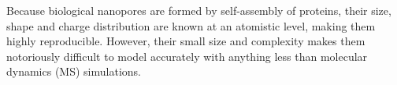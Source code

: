\documentclass[journal=ancac3,manuscript=article,etalmode=truncate,maxauthors=0,layout=twocolumn]{achemso}
\begin{document}
Because biological nanopores are formed by self-assembly of proteins, their size, shape and charge
distribution are known at an atomistic level, making them highly reproducible. However, their small size and
complexity makes them notoriously difficult to model accurately with anything less than molecular dynamics
(MS) simulations.






%
\end{document}
